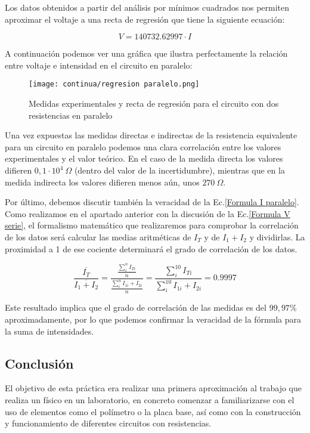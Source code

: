 \documentclass[a4paper,12pt,titlepage]{article}
\begin{document}
Los datos obtenidos a partir del análisis por mínimos cuadrados nos permiten aproximar el voltaje a una recta de regresión que tiene la siguiente ecuación:

\begin{equation}
    V = 140732.62997\cdot I
\end{equation}

A continuación podemos ver una gráfica que ilustra perfectamente la relación entre voltaje e intensidad en el circuito en paralelo:

\begin{figure}[ht]
    \centering
    \texttt{[image: continua/regresion paralelo.png]}
    \caption{Medidas experimentales y recta de regresión para el circuito con dos resistencias en paralelo}
    \label{fig:my_label}
\end{figure}

\newpage Una vez expuestas las medidas directas e indirectas de la resistencia equivalente para un circuito en paralelo podemos una clara correlación entre los valores experimentales y el valor teórico. En el caso de la medida directa los valores difieren $0,1 \cdot 10^4 \: \Omega$ (dentro del valor de la incertidumbre), mientras que en la medida indirecta los valores difieren menos aún, unos $270 \: \Omega$.

\par Por último, debemos discutir también la veracidad de la Ec.\ref{Formula I paralelo}. Como realizamos en el apartado anterior con la discusión de la Ec.\ref{Formula V serie}, el formalismo matemático que realizaremos para comprobar la correlación de los datos será calcular las medias aritméticas de $I_{T}$ y de $I_{1}+I_{2}$ y dividirlas. La proximidad a 1 de ese cociente determinará el grado de correlación de los datos.

\begin{equation}
    \frac{\overline{I_{T}}}{\overline{I_{1}+I_{2}}}=\frac{\frac{\sum_{i}^{n}I_{Ti}}{n}}{\frac{\sum_{i}^{n}I_{1i}+I_{2i}}{n}}=\frac{\sum_{i}^{10}I_{Ti}}{\sum_{i}^{10}I_{1i}+I_{2i}}=0.9997
\end{equation}

Este resultado implica que el grado de correlación de las medidas es del $99,97\%$ aproximadamente, por lo que podemos confirmar la veracidad de la fórmula para la suma de intensidades.

\subsection{Conclusión}
El objetivo de esta práctica era realizar una primera aproximación al trabajo que realiza un físico en un laboratorio, en concreto comenzar a familiarizarse con el uso de elementos como el polímetro o la placa base, así como con la construcción y funcionamiento de diferentes circuitos con resistencias.
\end{document}
